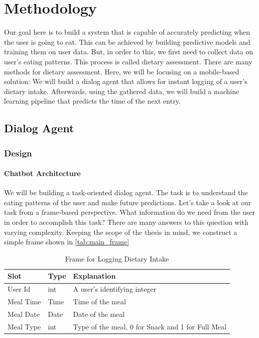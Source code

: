 
\chapter{Methodology}\label{chapter:methodology}
Our goal here is to build a system that is capable of accurately predicting when the user is going to eat.
This can be achieved by building predictive models and training them on user data.
But, in order to this, we first need to collect data on user's eating patterns.
This process is called dietary assessment.
There are many methods for dietary assessment.
Here, we will be focusing on a mobile-based solution:
We will build a dialog agent that allows for instant logging of a user's dietary intake.
Afterwards, using the gathered data, we will build a machine learning pipeline that predicts the time of the next entry.

\section{Dialog Agent}
\subsection{Design}
\subsubsection{Chatbot Architecture}
We will be building a task-oriented dialog agent.
The task is to understand the eating patterns of the user and make future predictions.
Let's take a look at our task from a frame-based perspective.
What information do we need from the user in order to accomplish this task?
There are many answers to this question with varying complexity.
Keeping the scope of the thesis in mind, we construct a simple frame shown in \autoref{tab:main_frame}

\begin{table}[htbp]
  \caption[Frame for Logging Dietary Intake]{Frame for Logging Dietary Intake}\label{tab:main_frame}
  \centering
  \begin{tabular}{l|l|l}
    Slot&Type&Explanation\\ \toprule
    User Id&int&A user's identifying integer \\ \hline
    Meal Time&Time&Time of the meal\\ \hline
    Meal Date&Date&Date of the meal\\ \hline
    Meal Type&int&Type of the meal, 0 for Snack and 1 for Full Meal \\ \hline
  \end{tabular}
\end{table}

